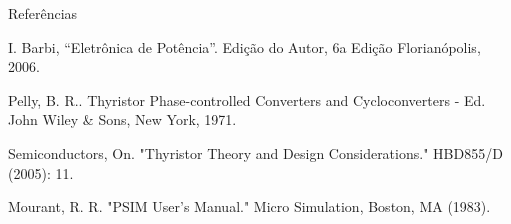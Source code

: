 \documentclass[aspectratio=43]{beamer}
\begin{document}
\begin{frame}[allowframebreaks]{Referências}
%



\begin{thebibliography}{}
	
	 I. Barbi, “Eletrônica de Potência”. Edição do Autor, 6a Edição Florianópolis,
	2006.
	
	 Pelly, B. R.. Thyristor Phase-controlled Converters and Cycloconverters - Ed. John Wiley \& Sons, New York, 1971.
	
	 Semiconductors, On. "Thyristor Theory and Design Considerations." HBD855/D (2005): 11.
	
	 Mourant, R. R. "PSIM User's Manual." Micro Simulation, Boston, MA (1983).
	
\end{thebibliography}
\end{frame}

\end{document}

